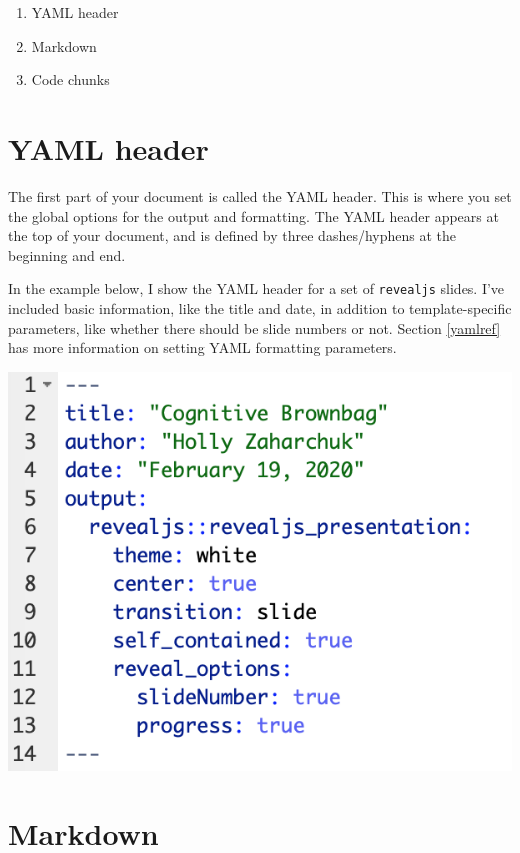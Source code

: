 \documentclass[
  openany]{book}
\providecommand{\tightlist}{%
  \setlength{\itemsep}{0pt}\setlength{\parskip}{0pt}}
\begin{document}
\begin{enumerate}
\def\labelenumi{\arabic{enumi}.}
\tightlist
\item
  YAML header
\item
  Markdown
\item
  Code chunks
\end{enumerate}

\hypertarget{yaml-header}{%
\section{YAML header}\label{yaml-header}}

The first part of your document is called the YAML header. This is where you set the global options for the output and formatting. The YAML header appears at the top of your document, and is defined by three dashes/hyphens at the beginning and end.

In the example below, I show the YAML header for a set of \texttt{revealjs} slides. I've included basic information, like the title and date, in addition to template-specific parameters, like whether there should be slide numbers or not. Section \ref{yamlref} has more information on setting YAML formatting parameters.

\includegraphics[width=\textwidth]{images/example_yaml}

\hypertarget{markintro}{%
\section{Markdown}\label{markintro}}
\end{document}
